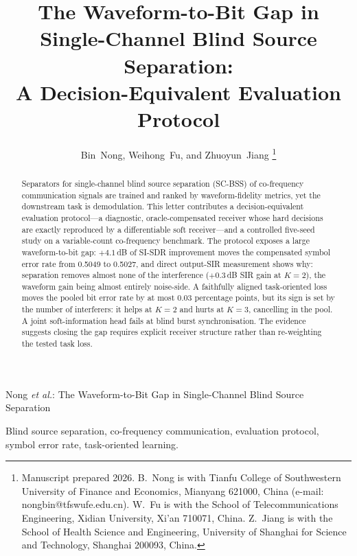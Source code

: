 \documentclass[journal]{IEEEtran}
\begin{document}
\title{The Waveform-to-Bit Gap in Single-Channel Blind Source
Separation:\\A Decision-Equivalent Evaluation Protocol}

\author{Bin~Nong, Weihong~Fu, and Zhuoyun~Jiang%
\thanks{Manuscript prepared 2026. B.~Nong is with Tianfu College of
Southwestern University of Finance and Economics, Mianyang 621000, China
(e-mail: nongbin@tfswufe.edu.cn). W.~Fu is with the School of
Telecommunications Engineering, Xidian University, Xi'an 710071, China.
Z.~Jiang is with the School of Health Science and Engineering,
University of Shanghai for Science and Technology, Shanghai 200093,
China.}}

%
{Nong \MakeLowercase{\textit{et al.}}: The Waveform-to-Bit Gap in
Single-Channel Blind Source Separation}

\maketitle

\begin{abstract}
Separators for single-channel blind source separation (SC-BSS) of
co-frequency communication signals are trained and ranked by
waveform-fidelity metrics, yet the downstream task is demodulation.
This letter contributes a decision-equivalent evaluation protocol---a
diagnostic, oracle-compensated receiver whose hard decisions are
exactly reproduced by a differentiable soft receiver---and a
controlled five-seed study on a variable-count co-frequency benchmark.
The protocol exposes a large waveform-to-bit gap: $+4.1$\,dB of SI-SDR
improvement moves the compensated symbol error rate from 0.5049 to
0.5027, and direct output-SIR measurement shows why: separation
removes almost none of the interference ($+0.3$\,dB SIR gain at
$K{=}2$), the waveform gain being almost entirely noise-side. A
faithfully aligned task-oriented loss moves the pooled bit error rate
by at most 0.03 percentage points, but its sign is set by the number
of interferers: it helps at $K{=}2$ and hurts at $K{=}3$, cancelling
in the pool. A joint soft-information head fails at blind burst
synchronisation. The evidence suggests closing the gap requires
explicit receiver structure rather than re-weighting the tested task
loss.
\end{abstract}

\begin{IEEEkeywords}
Blind source separation, co-frequency communication, evaluation
protocol, symbol error rate, task-oriented learning.
\end{IEEEkeywords}
\end{document}
